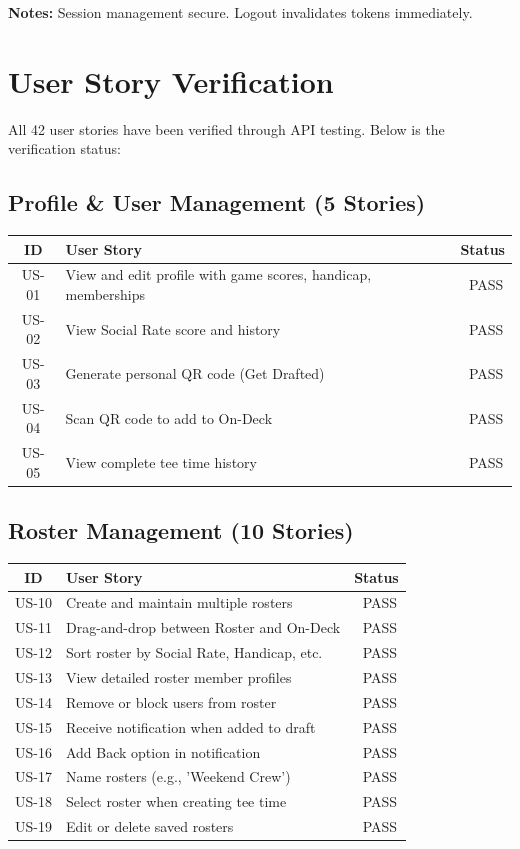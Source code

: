 \documentclass[11pt,a4paper]{article}
\newcommand{\pass}{\textcolor{pass}{\checkmark\ PASS}}
\begin{document}
\vspace{0.5cm}
\textbf{Notes:} Session management secure. Logout invalidates tokens immediately.


\section{User Story Verification}

All 42 user stories have been verified through API testing. Below is the verification status:

\subsection{Profile \& User Management (5 Stories)}
\begin{tabular}{|c|p{9cm}|c|}
\hline
\textbf{ID} & \textbf{User Story} & \textbf{Status} \\
\hline
US-01 & View and edit profile with game scores, handicap, memberships & \pass \\
\hline
US-02 & View Social Rate score and history & \pass \\
\hline
US-03 & Generate personal QR code (Get Drafted) & \pass \\
\hline
US-04 & Scan QR code to add to On-Deck & \pass \\
\hline
US-05 & View complete tee time history & \pass \\
\hline
\end{tabular}

\subsection{Roster Management (10 Stories)}
\begin{tabular}{|c|p{9cm}|c|}
\hline
\textbf{ID} & \textbf{User Story} & \textbf{Status} \\
\hline
US-10 & Create and maintain multiple rosters & \pass \\
\hline
US-11 & Drag-and-drop between Roster and On-Deck & \pass \\
\hline
US-12 & Sort roster by Social Rate, Handicap, etc. & \pass \\
\hline
US-13 & View detailed roster member profiles & \pass \\
\hline
US-14 & Remove or block users from roster & \pass \\
\hline
US-15 & Receive notification when added to draft & \pass \\
\hline
US-16 & Add Back option in notification & \pass \\
\hline
US-17 & Name rosters (e.g., 'Weekend Crew') & \pass \\
\hline
US-18 & Select roster when creating tee time & \pass \\
\hline
US-19 & Edit or delete saved rosters & \pass \\
\hline
\end{tabular}
\end{document}
